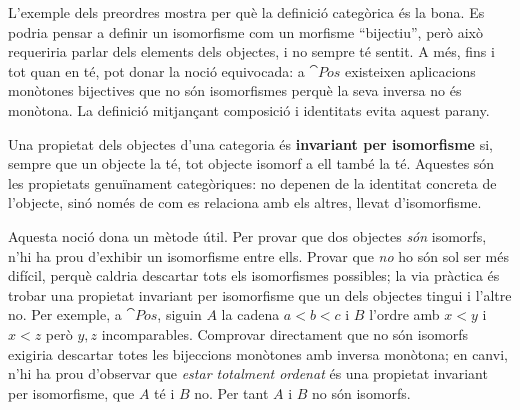 \begin{observacio}
L'exemple dels preordres mostra per què la definició categòrica és la bona. Es podria pensar a definir un isomorfisme com un morfisme \enquote{bijectiu}, però això requeriria parlar dels elements dels objectes, i no sempre té sentit. A més, fins i tot quan en té, pot donar la noció equivocada: a $\cat{Pos}$ existeixen aplicacions monòtones bijectives que no són isomorfismes perquè la seva inversa no és monòtona. La definició mitjançant composició i identitats evita aquest parany.
\end{observacio}

\begin{observacio}
Una propietat dels objectes d'una categoria és \textbf{invariant per isomorfisme} si, sempre que un objecte la té, tot objecte isomorf a ell també la té. Aquestes són les propietats genuïnament categòriques: no depenen de la identitat concreta de l'objecte, sinó només de com es relaciona amb els altres, llevat d'isomorfisme.

Aquesta noció dona un mètode útil. Per provar que dos objectes \emph{són} isomorfs, n'hi ha prou d'exhibir un isomorfisme entre ells. Provar que \emph{no} ho són sol ser més difícil, perquè caldria descartar tots els isomorfismes possibles; la via pràctica és trobar una propietat invariant per isomorfisme que un dels objectes tingui i l'altre no. Per exemple, a $\cat{Pos}$, siguin $A$ la cadena $a<b<c$ i $B$ l'ordre amb $x<y$ i $x<z$ però $y,z$ incomparables. Comprovar directament que no són isomorfs exigiria descartar totes les bijeccions monòtones amb inversa monòtona; en canvi, n'hi ha prou d'observar que \emph{estar totalment ordenat} és una propietat invariant per isomorfisme, que $A$ té i $B$ no. Per tant $A$ i $B$ no són isomorfs.
\end{observacio}

